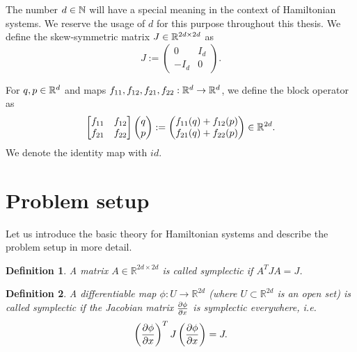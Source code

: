 \documentclass[twoside,a4paper]{article}
\newtheorem{definition}{Definition}
\begin{document}
The number $d \in \mathbb{N}$ will have a special meaning in the context of Hamiltonian systems.
We reserve the usage of $d$ for this purpose throughout this thesis. We define 
the skew-symmetric matrix $J \in \mathbb{R}^{2d \times 2d}$ as
\begin{equation*}
	J := \begin{pmatrix}
		0 & I_d \\
		-I_d & 0
	\end{pmatrix}
	.
\end{equation*}

For $q,p \in \mathbb{R}^{d}$ and maps $f_{11}, f_{12}, f_{21}, f_{22} : \mathbb{R}^d \to \mathbb{R}^d$,
we define the block operator as
\begin{equation*}
	\begin{bmatrix}
		f_{11} & f_{12} \\
		f_{21} & f_{22}
	\end{bmatrix}
	\begin{pmatrix} q \\ p \end{pmatrix}
	:= \begin{pmatrix}
		f_{11}(q) + f_{12}(p) \\
		f_{21}(q) + f_{22}(p)
	\end{pmatrix} \in \mathbb{R}^{2d}
	.
\end{equation*}
We denote the identity map with $id$.


%
%
\newpage
\section{Problem setup}\label{sec_problem_setup}
Let us introduce the basic theory for Hamiltonian systems and describe the problem
setup in more detail.

\begin{definition}
	A matrix $A \in \mathbb{R}^{2d \times 2d}$ is called symplectic if $A^TJA=J$.
\end{definition}

\begin{definition}
	A differentiable map $\phi : U \to \mathbb{R}^{2d}$ (where $U \subset \mathbb{R}^{2d}$ is an open set)
	is called symplectic if the Jacobian matrix $\frac{\partial \phi}{\partial x}$ is symplectic everywhere, i.e.
	\begin{equation*}
		\left( \frac{\partial \phi}{\partial x} \right)^T J \left( \frac{\partial \phi}{\partial x} \right) = J
		.
	\end{equation*}
\end{definition}
\end{document}
